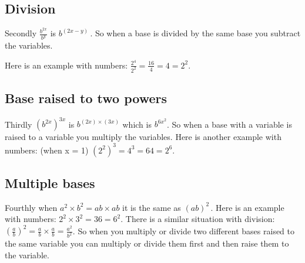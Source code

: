 \subsection{Division}
\label{sss:divi-50c9}




Secondly $\frac{b^{2x}}{b^y}$ is $b^{\left( 2x - y \right)}\,$. So when a base is divided
by the same base you subtract the variables.



Here is an example with numbers: $\frac{2^4}{2^2}=\frac{16}{4}=4=2^2$.




\subsection{Base raised to two powers}
\label{sss:base-831d}




Thirdly $\left(b^{2x}\right)^{3x}$ is $b^{\left(2x\right) \times \left(3x\right)}$ which
is $b^{6x^2}$. So when a base with a variable is raised to a variable you multiply the
variables. Here is another example with numbers: (when x = 1)
$\left(2^2\right)^3=4^3=64=2^6$.




\subsection{Multiple bases}
\label{sss:mult-6eef}




Fourthly when $a^2 \times b^2 = ab \times ab$ it is the same as $\left(ab\right)^2\,$.
Here is an example with numbers: $2^2 \times 3^2 = 36 = 6^2$. There is a similar situation
with division: $\left(\frac{a}{b}\right)^2 = \frac{a}{b} \times \frac{a}{b} =
\frac{a^2}{b^2}$. So when you multiply or divide two different bases raised to the same
variable you can multiply or divide them first and then raise them to the variable.




